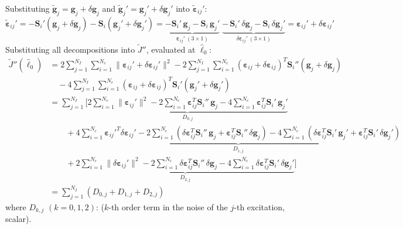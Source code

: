 \documentclass[11pt]{article}
\newcommand{\lh}{\hat{\ell}}
\begin{document}
Substituting $\tilde{\mathbf{g}}_j=\mathbf{g}_j+\delta\mathbf{g}_j$ and $\tilde{\mathbf{g}}_j'=\mathbf{g}_j'+\delta\mathbf{g}_j'$ into $\tilde{\boldsymbol{\varepsilon}}_{ij}'$:
\[
\tilde{\boldsymbol{\varepsilon}}_{ij}'=-\mathbf{S}_i'\left(\mathbf{g}_j+\delta\mathbf{g}_j\right)-\mathbf{S}_i\left(\mathbf{g}_j'+\delta\mathbf{g}_j'\right)
=\underbrace{-\mathbf{S}_i'\,\mathbf{g}_j-\mathbf{S}_i\,\mathbf{g}_j'}_{\boldsymbol{\varepsilon}_{ij}'\ (3\times1)}
\;\underbrace{-\,\mathbf{S}_i'\,\delta\mathbf{g}_j-\mathbf{S}_i\,\delta\mathbf{g}_j'}_{\delta\boldsymbol{\varepsilon}_{ij}'\ (3\times1)}
=\boldsymbol{\varepsilon}_{ij}'+\delta\boldsymbol{\varepsilon}_{ij}'
\]
Substituting all decompositions into $\tilde{J}''$, evaluated at $\lh_0$:
\[
\begin{aligned}
\tilde{J}''(\lh_0)&=2\sum_{j=1}^{N_I}\sum_{i=1}^{N_c}\|\boldsymbol{\varepsilon}_{ij}'+\delta\boldsymbol{\varepsilon}_{ij}'\|^{2}
-2\sum_{j=1}^{N_I}\sum_{i=1}^{N_c}\left(\boldsymbol{\varepsilon}_{ij}+\delta\boldsymbol{\varepsilon}_{ij}\right)^{T}\mathbf{S}_i''\left(\mathbf{g}_j+\delta\mathbf{g}_j\right)\\
&\quad-4\sum_{j=1}^{N_I}\sum_{i=1}^{N_c}\left(\boldsymbol{\varepsilon}_{ij}+\delta\boldsymbol{\varepsilon}_{ij}\right)^{T}\mathbf{S}_i'\left(\mathbf{g}_j'+\delta\mathbf{g}_j'\right)\\
&=\sum_{j=1}^{N_I}\Bigg[\underbrace{2\sum_{i=1}^{N_c}\|\boldsymbol{\varepsilon}_{ij}'\|^{2}
-2\sum_{i=1}^{N_c}\boldsymbol{\varepsilon}_{ij}^{T}\mathbf{S}_i''\,\mathbf{g}_j
-4\sum_{i=1}^{N_c}\boldsymbol{\varepsilon}_{ij}^{T}\mathbf{S}_i'\,\mathbf{g}_j'}_{D_{0,j}}\\
&\qquad+\underbrace{4\sum_{i=1}^{N_c}\boldsymbol{\varepsilon}_{ij}'^{T}\delta\boldsymbol{\varepsilon}_{ij}'
-2\sum_{i=1}^{N_c}\left(\delta\boldsymbol{\varepsilon}_{ij}^{T}\mathbf{S}_i''\,\mathbf{g}_j+\boldsymbol{\varepsilon}_{ij}^{T}\mathbf{S}_i''\,\delta\mathbf{g}_j\right)
-4\sum_{i=1}^{N_c}\left(\delta\boldsymbol{\varepsilon}_{ij}^{T}\mathbf{S}_i'\,\mathbf{g}_j'+\boldsymbol{\varepsilon}_{ij}^{T}\mathbf{S}_i'\,\delta\mathbf{g}_j'\right)}_{D_{1,j}}\\
&\qquad+\underbrace{2\sum_{i=1}^{N_c}\|\delta\boldsymbol{\varepsilon}_{ij}'\|^{2}
-2\sum_{i=1}^{N_c}\delta\boldsymbol{\varepsilon}_{ij}^{T}\mathbf{S}_i''\,\delta\mathbf{g}_j
-4\sum_{i=1}^{N_c}\delta\boldsymbol{\varepsilon}_{ij}^{T}\mathbf{S}_i'\,\delta\mathbf{g}_j'}_{D_{2,j}}\Bigg]\\
&=\sum_{j=1}^{N_I}\left(D_{0,j}+D_{1,j}+D_{2,j}\right)
\end{aligned}
\]
where $D_{k,j}$ $(k=0,1,2)$: ($k$-th order term in the noise of the $j$-th excitation, scalar).
\end{document}
